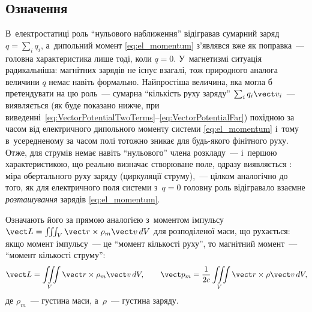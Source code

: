\subsection*{Означення}


В~електростатиці роль \enquote{нульового наближення} відігравав сумарний заряд $q=\sum_i
	q_i$, а~дипольний момент \eqref{eq:el_momentum} з'являвся вже як поправка~--- головна
характеристика лише тоді, коли $q=0$. У~магнетизмі ситуація радикальніша: магнітних
зарядів не існує взагалі, тож природного аналога величини $q$ немає навіть формально.
Найпростіша величина, яка могла б претендувати на цю роль~--- сумарна \enquote{кількість
	руху заряду} $\sum_i q_i\vect v_i$~--- виявляється (як буде показано нижче, при
виведенні~\eqref{eq:VectorPotentialTwoTerms}--\eqref{eq:VectorPotentialFar}) похідною за
часом від електричного дипольного моменту системи \eqref{eq:el_momentum} і~тому
в~усередненому за часом полі тотожно зникає для будь-якого фінітного руху. Отже, для
струмів немає навіть \enquote{нульового} члена розкладу~--- і~першою характеристикою, що
реально визначає створюване поле, одразу виявляється : міра
обертального руху заряду (циркуляції струму),~--- цілком аналогічно до того, як для
електричного поля системи з~$q=0$ головну роль відігравало взаємне \emph{розташування}
зарядів \eqref{eq:el_momentum}.

Означають його за прямою аналогією з~моментом імпульсу $\vect L = \iiint_V \vect r\times
	\rho_m\vect v\, dV$ для розподіленої маси, що рухається: якщо момент імпульсу~--- це
\enquote{момент кількості руху}, то магнітний момент~--- \enquote{момент кількості
	струму}:
\begin{equation*}
	\vect L = \iiint\limits_V \vect r\times\rho_m\vect v\, dV, \qquad \vect p_m = \frac1{2c}\iiint\limits_V \vect r\times\rho\vect v\, dV,
\end{equation*}
де $\rho_m$~--- густина маси, а~$\rho$~--- густина заряду.

